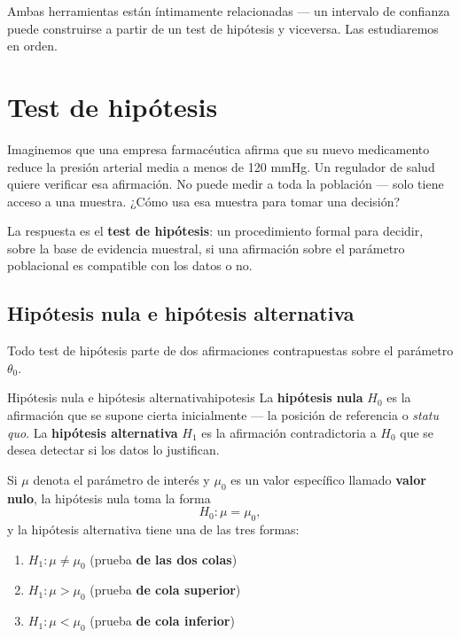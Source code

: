 \documentclass[12pt, a4paper]{book}
\numberwithin{equation}{chapter}
\begin{document}
\medskip
Ambas herramientas est\'{a}n \'{i}ntimamente relacionadas
--- un intervalo de confianza puede construirse a partir
de un test de hip\'{o}tesis y viceversa. Las estudiaremos
en orden.

\section{Test de hip\'{o}tesis}

Imaginemos que una empresa farmac\'{e}utica afirma que
su nuevo medicamento reduce la presi\'{o}n arterial media
a menos de 120 mmHg. Un regulador de salud quiere
verificar esa afirmaci\'{o}n. No puede medir a toda la
poblaci\'{o}n --- solo tiene acceso a una muestra. ¿C\'{o}mo
usa esa muestra para tomar una decisi\'{o}n?

La respuesta es el \textbf{test de hip\'{o}tesis}: un
procedimiento formal para decidir, sobre la base de
evidencia muestral, si una afirmaci\'{o}n sobre el
par\'{a}metro poblacional es compatible con los datos
o no.

\subsection{Hip\'{o}tesis nula e hip\'{o}tesis alternativa}

Todo test de hip\'{o}tesis parte de dos afirmaciones
contrapuestas sobre el par\'{a}metro $\theta_0$.

\begin{definicion}{Hip\'{o}tesis nula e hip\'{o}tesis
		alternativa}{hipotesis}
	La \textbf{hip\'{o}tesis nula} $H_0$ es la afirmaci\'{o}n
	que se supone cierta inicialmente --- la posici\'{o}n
	de referencia o \emph{statu quo}. La \textbf{hip\'{o}tesis
		alternativa} $H_1$ es la afirmaci\'{o}n contradictoria
	a $H_0$ que se desea detectar si los datos lo justifican.
	
	Si $\mu$ denota el par\'{a}metro de inter\'{e}s y
	$\mu_0$ es un valor espec\'{i}fico llamado
	\textbf{valor nulo}, la hip\'{o}tesis nula toma
	la forma
	\[
	H_0: \mu = \mu_0,
	\]
	y la hip\'{o}tesis alternativa tiene una de las
	tres formas:
	\begin{enumerate}[label=\textbf{\arabic*.}]
		\item $H_1: \mu \neq \mu_0$ \quad
		(prueba \textbf{de las dos colas})
		\item $H_1: \mu > \mu_0$ \quad
		(prueba \textbf{de cola superior})
		\item $H_1: \mu < \mu_0$ \quad
		(prueba \textbf{de cola inferior})
	\end{enumerate}
\end{definicion}
\end{document}
